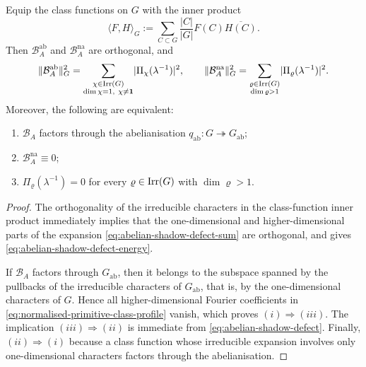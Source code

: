 \begin{theorem}
  \label{thm:abelian-shadow-defect}
  Equip the class functions on \(G\) with the inner product
  \[
    \langle F,H\rangle_G
    :=
    \sum_{C\subset G}\frac{|C|}{|G|}F(C)\overline{H(C)}.
  \]
  Then \(\mathcal B_A^{\mathrm{ab}}\) and \(\mathcal B_A^{\mathrm{na}}\)
  are orthogonal, and
  \begin{equation}\label{eq:abelian-shadow-defect-energy}
    \lVert \mathcal B_A^{\mathrm{ab}} \rVert_G^2
    =
    \sum_{\substack{\chi\in\operatorname{Irr}(G)\\ \dim\chi=1,\ \chi\neq \mathbf 1}}
      \lvert \Pi_\chi(\lambda^{-1}) \rvert^2,
    \qquad
    \lVert \mathcal B_A^{\mathrm{na}} \rVert_G^2
    =
    \sum_{\substack{\varrho\in\operatorname{Irr}(G)\\ \dim\varrho>1}}
      \lvert \Pi_\varrho(\lambda^{-1}) \rvert^2.
  \end{equation}
  Moreover, the following are equivalent:
  \begin{enumerate}[label=\textup{(\roman*)}]
    \item \(\mathcal B_A\) factors through the abelianisation
      \(q_{\mathrm{ab}}:G\twoheadrightarrow G_{\mathrm{ab}}\);
    \item \(\mathcal B_A^{\mathrm{na}}\equiv 0\);
    \item \(\Pi_\varrho(\lambda^{-1})=0\) for every
      \(\varrho\in\operatorname{Irr}(G)\) with \(\dim\varrho>1\).
  \end{enumerate}
\end{theorem}

\begin{proof}
  The orthogonality of the irreducible characters in the class-function
  inner product immediately implies that the one-dimensional and
  higher-dimensional parts of the expansion
  \eqref{eq:abelian-shadow-defect-sum} are orthogonal, and gives
  \eqref{eq:abelian-shadow-defect-energy}.

  If \(\mathcal B_A\) factors through \(G_{\mathrm{ab}}\), then it
  belongs to the subspace spanned by the pullbacks of the irreducible
  characters of \(G_{\mathrm{ab}}\), that is, by the one-dimensional
  characters of \(G\). Hence all higher-dimensional Fourier coefficients
  in \eqref{eq:normalised-primitive-class-profile} vanish, which proves
  \((i)\Rightarrow(iii)\). The implication \((iii)\Rightarrow(ii)\) is
  immediate from \eqref{eq:abelian-shadow-defect}. Finally,
  \((ii)\Rightarrow(i)\) because a class function whose irreducible
  expansion involves only one-dimensional characters factors through the
  abelianisation.
\end{proof}

